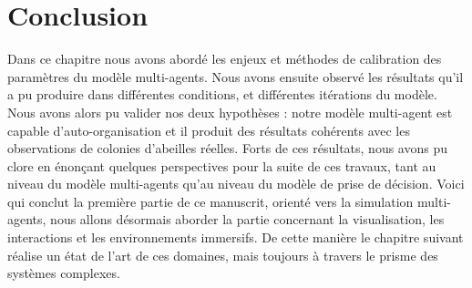 	\section*{Conclusion}
	Dans ce chapitre nous avons abordé les enjeux et méthodes de calibration des paramètres du modèle multi-agents. Nous avons ensuite observé les résultats qu'il a pu produire dans différentes conditions, et différentes itérations du modèle. Nous avons alors pu valider nos deux hypothèses : notre modèle multi-agent est capable d'auto-organisation et il produit des résultats cohérents avec les observations de colonies d'abeilles réelles. Forts de ces résultats, nous avons pu clore en énonçant quelques perspectives pour la suite de ces travaux, tant au niveau du modèle multi-agents qu'au niveau du modèle de prise de décision. Voici qui conclut la première partie de ce manuscrit, orienté vers la simulation multi-agents, nous allons désormais aborder la partie concernant la visualisation, les interactions et les environnements immersifs. De cette manière le chapitre suivant réalise un état de l'art de ces domaines, mais toujours à travers le prisme des systèmes complexes.